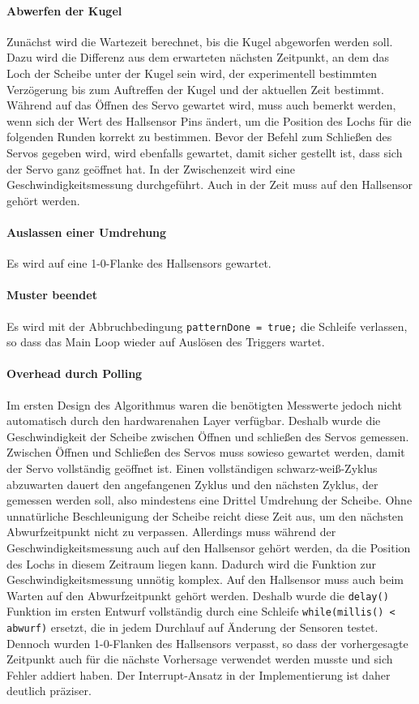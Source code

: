 \documentclass{kis}
\begin{document}
\paragraph{Abwerfen der Kugel}
Zunächst wird die Wartezeit berechnet, bis die Kugel abgeworfen werden soll. Dazu wird die Differenz aus dem erwarteten nächsten Zeitpunkt, an dem das Loch der Scheibe unter der Kugel sein wird, der experimentell bestimmten Verzögerung bis zum Auftreffen der Kugel und der aktuellen Zeit bestimmt. Während auf das Öffnen des Servo gewartet wird, muss auch bemerkt werden, wenn sich der Wert des Hallsensor Pins ändert, um die Position des Lochs für die folgenden Runden korrekt zu bestimmen. Bevor der Befehl zum Schließen des Servos gegeben wird, wird ebenfalls gewartet, damit sicher gestellt ist, dass sich der Servo ganz geöffnet hat. In der Zwischenzeit wird eine Geschwindigkeitsmessung durchgeführt. Auch in der Zeit muss auf den Hallsensor gehört werden.

\paragraph{Auslassen einer Umdrehung}
Es wird auf eine 1-0-Flanke des Hallsensors gewartet.

\paragraph{Muster beendet}
Es wird mit der Abbruchbedingung \texttt{patternDone = true;} die Schleife verlassen, so dass das Main Loop wieder auf Auslösen des Triggers wartet.

\paragraph{Overhead durch Polling}
Im ersten Design des Algorithmus waren die benötigten Messwerte jedoch nicht automatisch durch den hardwarenahen Layer verfügbar. Deshalb wurde die Geschwindigkeit der Scheibe zwischen Öffnen und schließen des Servos gemessen. Zwischen Öffnen und Schließen des Servos muss sowieso gewartet werden, damit der Servo vollständig geöffnet ist. Einen vollständigen schwarz-weiß-Zyklus abzuwarten dauert den angefangenen Zyklus und den nächsten Zyklus, der gemessen werden soll, also mindestens eine Drittel Umdrehung der Scheibe. Ohne unnatürliche Beschleunigung der Scheibe reicht diese Zeit aus, um den nächsten Abwurfzeitpunkt nicht zu verpassen. Allerdings muss während der Geschwindigkeitsmessung auch auf den Hallsensor gehört werden, da die Position des Lochs in diesem Zeitraum liegen kann. Dadurch wird die Funktion zur Geschwindigkeitsmessung unnötig komplex. Auf den Hallsensor muss auch beim Warten auf den Abwurfzeitpunkt gehört werden. Deshalb wurde die \texttt{delay()} Funktion im ersten Entwurf vollständig durch eine Schleife \texttt{while(millis() < abwurf)} ersetzt, die in jedem Durchlauf auf Änderung der Sensoren testet. Dennoch wurden 1-0-Flanken des Hallsensors verpasst, so dass der vorhergesagte Zeitpunkt auch für die nächste Vorhersage verwendet werden musste und sich Fehler addiert haben. Der Interrupt-Ansatz in der Implementierung ist daher deutlich präziser.
\end{document}

